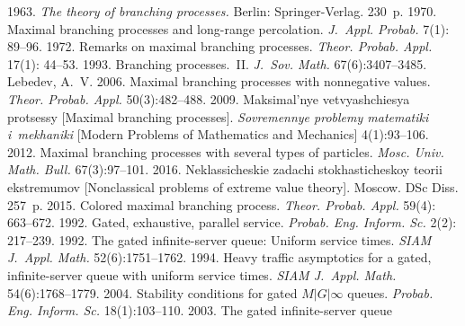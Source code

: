   \begin{multicols}{2}

\renewcommand{\bibname}{\protect\rmfamily References}

{\small\frenchspacing
 {%
 \begin{thebibliography}{99}
 1963. \textit{The theory of branching processes.} 
Berlin: Springer-Verlag. 230~p.
 1970. Maximal branching processes and long-range
per\-co\-la\-ti\-on. \textit{J.~Appl. Probab.} 7(1): 89--96.
 1972. Remarks on maximal branching processes.
\textit{Theor. Probab. Appl.} 17(1): 44--53.
 1993. Branching processes.~II. 
\textit{J.~Sov. Math.} 67(6):3407--3485.
Lebedev, A.~V. 2006. Maximal branching processes with nonnegative values.
{\it Theor. Probab. Appl.} 50(3):482--488.
 2009. Maksimal'nye vetvyashchiesya protsessy 
[Maximal branching processes].
\textit{Sovremennye problemy matematiki i~mekhaniki} 
[Modern Problems of Mathematics and Mechanics]
4(1):93--106.
 2012. Maximal branching processes with 
several types of particles.
\textit{Mosc. Univ. Math. Bull.} 67(3):97--101.
 2016. {Neklassicheskie zadachi sto\-kha\-sti\-che\-skoy 
teorii ekstremumov}
[Nonclassical problems of extreme value theory].  Moscow. DSc Diss. 257~p.
2015. Colored maximal branching process.
\textit{Theor. Probab. Appl.} 59(4): 663--672.
 1992. Gated, exhaustive,
parallel service. \textit{Probab. Eng. Inform. Sc.} 2(2): 217--239.
 1992. The gated
infinite-server queue: Uniform service times. \textit{SIAM J.~Appl. Math.}
52(6):1751--1762.
 1994. Heavy traffic asymptotics for a gated,
infinite-server queue with uniform service times. \textit{SIAM J.~Appl. Math.}
54(6):1768--1779.
 2004. Stability conditions for gated
$M|G|\infty$ queues. \textit{Probab. Eng. Inform. Sc.} 18(1):103--110.
 2003. The gated infinite-server queue 

\end{thebibliography}}}
\end{multicols}
